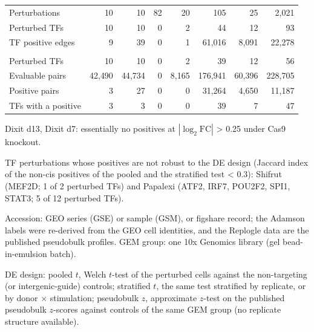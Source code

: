 \begin{table}[tbp]
\begin{tabular}{@{}lrrrrrrr@{}}
Perturbations & 10 & 10 & 82 & 20 & 105 & 25 & 2{,}021 \\
Perturbed TFs & 10 & 10 & 0 & 2 & 44 & 12 & 93 \\
TF positive edges & 9 & 39 & 0 & 1 & 61{,}016 & 8{,}091 & 22{,}278 \\
\addlinespace[3pt]
\multicolumn{8}{@{}l}{\emph{Global universe}} \\
Perturbed TFs & 10 & 10 & 0 & 2 & 39 & 12 & 56 \\
Evaluable pairs & 42{,}490 & 44{,}734 & 0 & 8{,}165 & 176{,}941 & 60{,}396 & 228{,}705 \\
Positive pairs & 3 & 27 & 0 & 0 & 31{,}264 & 4{,}650 & 11{,}187 \\
TFs with a positive & 3 & 3 & 0 & 0 & 39 & 7 & 47 \\
\bottomrule
\end{tabular}
\par\smallskip
\begin{minipage}{\linewidth}\footnotesize
Dixit d13, Dixit d7: essentially no positives at $|\log_2\mathrm{FC}|$ > 0.25 under Cas9 knockout.

TF perturbations whose positives are not robust to the DE design (Jaccard index of the non-cis positives of the pooled and the stratified test < 0.3): Shifrut (MEF2D; 1 of 2 perturbed TFs) and Papalexi (ATF2, IRF7, POU2F2, SPI1, STAT3; 5 of 12 perturbed TFs).

Accession: GEO series (GSE) or sample (GSM), or figshare record; the Adamson labels were re-derived from the GEO cell identities, and the Replogle data are the published pseudobulk profiles. GEM group: one 10x Genomics library (gel bead-in-emulsion batch).

DE design: pooled $t$, Welch $t$-test of the perturbed cells against the non-targeting (or intergenic-guide) controls; stratified $t$, the same test stratified by replicate, or by donor $\times$ stimulation; pseudobulk $z$, approximate $z$-test on the published pseudobulk $z$-scores against controls of the same GEM group (no replicate structure available).
\end{minipage}
\end{table}
